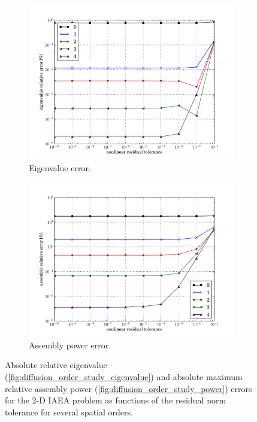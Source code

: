 \begin{figure}[htbp]
  \centering
  \begin{subfigure}{0.49\textwidth}
    \centering
    \includegraphics[keepaspectratio, width=1.0\textwidth]
                    {tolerance_study_eigenvalue}
    \caption{Eigenvalue error.}
    \label{fig:tolerance_study_eigenvalue}                   
  \end{subfigure}
  \begin{subfigure}{0.49\textwidth}
    \centering
    \includegraphics[keepaspectratio, width=1.0\textwidth]
                    {tolerance_study_power}
    \caption{Assembly power error.}
    \label{fig:tolerance_study_power}                 
  \end{subfigure}
  \caption{Absolute relative eigenvalue 
          (\ref{fig:diffusion_order_study_eigenvalue}) and 
          absolute maximum relative 
          assembly power
           (\ref{fig:diffusion_order_study_power})
          errors for the 2-D IAEA problem as functions of the
          residual norm tolerance for several spatial orders.}
  \label{fig:diffusion_order_study}
\end{figure}


